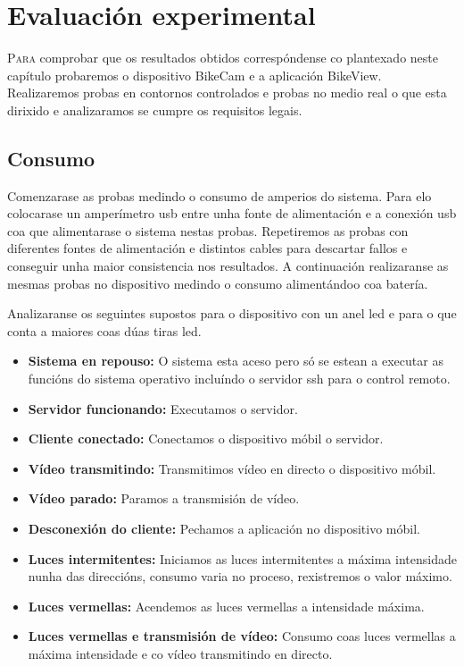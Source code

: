 \chapter{Evaluación experimental}
\label{chap:evaluacion_experimenal}
\lettrine{P}{ara} comprobar que os resultados obtidos correspóndense co plantexado neste capítulo probaremos o dispositivo BikeCam e a aplicación BikeView. Realizaremos probas en contornos controlados e probas no medio real o que esta dirixido e analizaramos se cumpre os requisitos legais.

\section{Consumo}

Comenzarase as probas medindo o consumo de amperios do sistema. Para elo colocarase un amperímetro usb entre unha fonte de alimentación e a conexión usb coa que alimentarase o sistema nestas probas. Repetiremos as probas con diferentes fontes de alimentación e distintos cables para descartar fallos e conseguir unha maior consistencia nos resultados. A continuación realizaranse as mesmas probas no dispositivo medindo o consumo alimentándoo coa batería.

Analizaranse os seguintes supostos para o dispositivo con un anel led e para o que conta a maiores coas dúas tiras led.
\begin{itemize}
    \item \textbf{Sistema en repouso: }
    O sistema esta aceso pero só se estean a executar as funcións do sistema operativo incluíndo o servidor ssh para o control remoto.
    \item \textbf{Servidor funcionando:}
    Executamos o servidor.
    \item \textbf{Cliente conectado:}
    Conectamos o dispositivo móbil o servidor.
    \item \textbf{Vídeo transmitindo:}
    Transmitimos vídeo en directo o dispositivo móbil.
    \item \textbf{Vídeo parado:}
    Paramos a transmisión de vídeo.
    \item \textbf{Desconexión do cliente:}
    Pechamos a aplicación no dispositivo móbil.
    \item \textbf{Luces intermitentes:}
    Iniciamos as luces intermitentes a máxima intensidade nunha das direccións, consumo varia no proceso, rexistremos o valor máximo.
    \item \textbf{Luces vermellas:}
    Acendemos as luces vermellas a intensidade máxima.
    \item \textbf{Luces vermellas e transmisión de vídeo:}
    Consumo coas luces vermellas a máxima intensidade e co vídeo transmitindo en directo.
\end{itemize}

